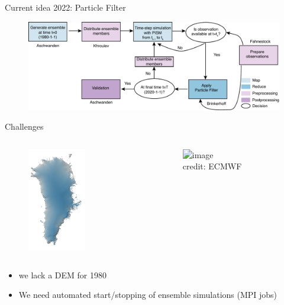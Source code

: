 \documentclass[hide notes,intlimits]{beamer}
\begin{document}
\begin{frame}{Current idea 2022: Particle Filter}
  \begin{figure}
    \includegraphics[width=\textwidth]{flowchart-particle-filter-tasks}
  \end{figure}
\end{frame}


\begin{frame}{Challenges}
  \begin{columns}[c]
    \begin{column}{.35\textwidth}
      \begin{figure}
        \includegraphics[height=4.5cm]{gris-surface-dem}
      \end{figure}
    \end{column}
    \begin{column}{.6\textwidth}
  \begin{figure}
  \includegraphics<1>[width=6cm]{initial-state-ensemble} \\
    \tiny{credit: ECMWF}
  \end{figure}
    \end{column}
  \end{columns}
  \begin{itemize}
    \item we lack a DEM for 1980
    \item We need automated start/stopping of ensemble simulations (MPI jobs)
  \end{itemize}
\end{frame}
\end{document}
